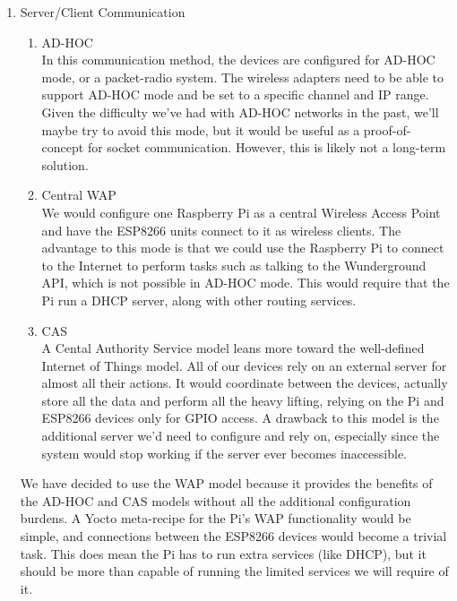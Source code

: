 \documentclass[12pt]{article}
\begin{document}
\begin{enumerate}
    \item Server/Client Communication
        \begin{enumerate}
            \item AD-HOC \\
            In this communication method, the devices are configured for AD-HOC mode, or a packet-radio system. The wireless adapters need to be able to support AD-HOC mode and be set to a specific channel and IP range. Given the difficulty we've had with AD-HOC networks in the past, we'll maybe try to avoid this mode, but it would be useful as a proof-of-concept for socket communication. However, this is likely not a long-term solution.
            \item Central WAP \\
            We would configure one Raspberry Pi as a central Wireless Access Point and have the ESP8266 units connect to it as wireless clients. The advantage to this mode is that we could use the Raspberry Pi to connect to the Internet to perform tasks such as talking to the Wunderground API, which is not possible in AD-HOC mode. This would require that the Pi run a DHCP server, along with other routing services.
            \item CAS \\
            A Cental Authority Service model leans more toward the well-defined Internet of Things model. All of our devices rely on an external server for almost all their actions. It would coordinate between the devices, actually store all the data and perform all the heavy lifting, relying on the Pi and ESP8266 devices only for GPIO access. A drawback to this model is the additional server we'd need to configure and rely on, especially since the system would stop working if the server ever becomes inaccessible.
        \end{enumerate}
        We have decided to use the WAP model because it provides the benefits of the AD-HOC and CAS models without all the additional configuration burdens. A Yocto meta-recipe for the Pi's WAP functionality would be simple, and connections between the ESP8266 devices would become a trivial task. This does mean the Pi has to run extra services (like DHCP), but it should be more than capable of running the limited services we will require of it.
\end{enumerate}
    
\end{document}
